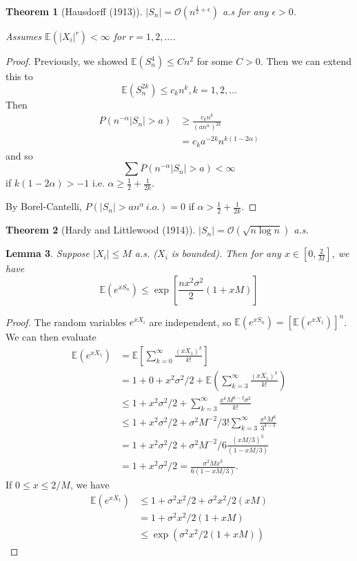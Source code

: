 \documentclass[10pt, oneside, reqno]{amsart}
\theoremstyle{plain}%
\newtheorem{thm}{Theorem}[section]
\newtheorem{lem}[thm]{Lemma}
\theoremstyle{definition}
\theoremstyle{remark}
\newcommand{\E}{\mathbb{E}}
\begin{document}
\begin{thm}[Hausdorff (1913)]   $|S_n | = \mathcal{O}(n^{\frac{1}{2} + \epsilon})$ a.s for any $\epsilon > 0$.
	
	Assumes $\E(|X_i|^r) < \infty$ for $r = 1, 2, \dots$. 
\end{thm}

\begin{proof}
	Previously, we showed $\E(S_n^4) \leq Cn^2$ for some $C > 0$.  Then we can extend this to \[
		\E(S_n^{2k}) \leq c_k n^k, k = 1, 2, \dots
	\] Then \begin{align*}
		P(n^{-\alpha} |S_n| > a ) &\geq \frac{c_k n^k}{(a n^{\alpha})^{2k}} \\
								&= c_k a^{-2k} n^{k(1-2\alpha)}
	\end{align*} and so \[
		\sum P( n^{-\alpha} |S_n| > a) < \infty 
	\] if $k(1-2\alpha) > -1$ i.e. $\alpha \geq \frac{1}{2} + \frac{1}{2k}$.  
	
	By Borel-Cantelli, $P(|S_n| > an^{\alpha} \, i.o.) = 0$ if $\alpha > \frac{1}{2} + \frac{1}{2k}$.  
\end{proof} 
\begin{thm}[Hardy and Littlewood (1914)] $|S_n| = \mathcal{O}(\sqrt{n \log n})$ a.s.
\end{thm}
\begin{lem}
	Suppose $|X_i| \leq M$ a.s. ($X_i$ is bounded).  Then for any $x \in [0, \frac{2}{M}]$, we have \[
		\E(e^{x S_n}) \leq \exp[ \frac{nx^2 \sigma^2}{2}(1 + xM)]
	\]  
\end{lem}

\begin{proof}
	The random variables $e^{x X_i}$ are independent, so $\E(e^{x S_n}) = \left[ \E(e^{x X_1})\right]^n$.  We can then evaluate 
	\begin{align*}
		\E(e^{x X_1}) &= \E \left[ \sum_{k=0}^\infty \frac{(x X_1)^k}{k!} \right] \\
		&= 1 +0 + x^2 \sigma^2/2 + \E(\sum_{k=3}^\infty \frac{(x X_1)^k}{k!}) \\
		&\leq 1 + x^2 \sigma^2/2 + \sum_{k=3}^\infty \frac{x^k M^{k-2} \sigma^2}{k!} \\
		& \leq 1  + x^2 \sigma^2/2 + \sigma^2 M^{-2}/3! \sum_{k=3}^\infty \frac{x^k M^k}{3^{k-3}} \\
		&= 1 + x^2 \sigma^2/2 + \sigma^2 M^{-2}/6  \frac{ (xM/3)^3}{(1-xM/3)} \\
		&= 1 + x^2 \sigma^2/2 = \frac{\sigma^2 M x^3}{6(1-xM/3)}.
	\end{align*}  If $0 \leq x \leq 2/M$, we have \begin{align*}	
	\E(e^{x X_1}) 	&\leq 1 + \sigma^2 x^2/2 + \sigma^2 x^2 /2(xM) \\
						&= 1 + \sigma^2 x^2/2(1 + xM) \\
						&\leq \exp(\sigma^2 x^2/2(1 + xM))
	\end{align*}

\end{proof}
\end{document}
